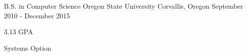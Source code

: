 

\begin{cventries}

  \cventry
    {B.S. in Computer Science} %
    {Oregon State University} %
    {Corvallis, Oregon} %
    {September 2010 - December 2015} %
    {
      \begin{cvitems} %
        \item {3.13 GPA}
        \item {Systems Option}
      \end{cvitems}
    }

\end{cventries}
